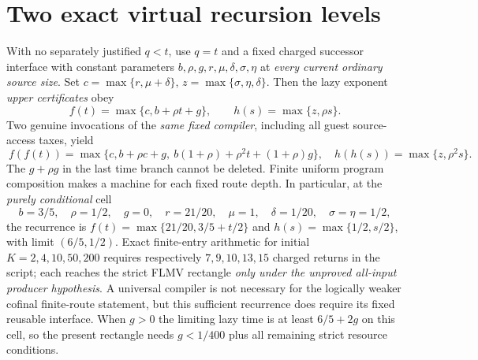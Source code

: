 \documentclass[11pt]{article}
\begin{document}
\section{Two exact virtual recursion levels}
With no separately justified $q<t$, use $q=t$ and a fixed
charged successor interface with constant parameters $b,\rho,g,r,\mu,
\delta,\sigma,\eta$ at \emph{every current ordinary source size}.
Set $c=\max\{r,\mu+\delta\}$, $z=\max\{\sigma,\eta,\delta\}$.
Then the lazy exponent \emph{upper certificates} obey
\[
  f(t)=\max\{c,b+\rho t+g\},\qquad
  h(s)=\max\{z,\rho s\}.
\]
Two genuine invocations of the \emph{same fixed compiler}, including
all guest source-access taxes, yield
\[
\boxed{\ f(f(t))=
\max\{c,b+\rho c+g,\ b(1+\rho)+\rho^2t+(1+\rho)g\},\quad
h(h(s))=\max\{z,\rho^2s\}. \ } \tag{3}
\]
The $g+\rho g$ in the last time branch cannot be deleted.
Finite uniform program composition makes a machine for each
fixed route depth. In particular, at the \emph{purely conditional}
cell
\[
 b=3/5,\quad\rho=1/2,\quad g=0,\quad
 r=21/20,\quad\mu=1,\quad\delta=1/20,\quad
 \sigma=\eta=1/2,
\]
the recurrence is
$f(t)=\max\{21/20,3/5+t/2\}$ and
$h(s)=\max\{1/2,s/2\}$, with limit $(6/5,1/2)$.
Exact finite-entry arithmetic for initial $K=2,4,10,50,200$
requires respectively $7,9,10,13,15$ charged returns in the
script; each reaches the strict FLMV rectangle \emph{only under
the unproved all-input producer hypothesis}. A universal
compiler is not necessary for the logically weaker cofinal
finite-route statement, but this sufficient recurrence
does require its fixed reusable interface. When $g>0$
the limiting lazy time is at least $6/5+2g$ on this cell,
so the present rectangle needs $g<1/400$ plus all remaining
strict resource conditions.
\end{document}
